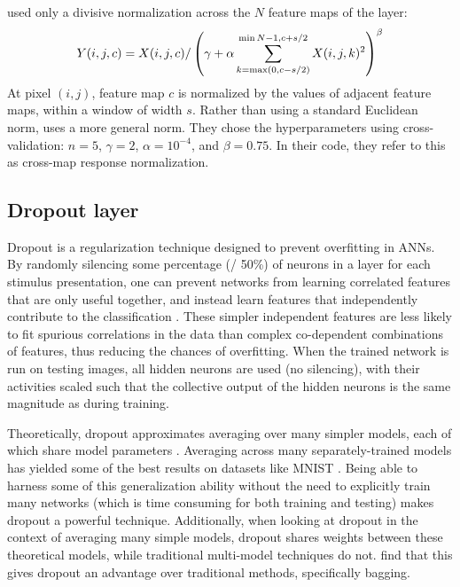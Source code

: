 \textcite{Krizhevsky2012} used only a divisive normalization across the
$N$ feature maps of the layer:
\begin{align}
  Y(i,j,c) = X(i,j,c) / \left(\gamma + \alpha\sum_{k=\max(0,c-s/2)}^{\min{N-1,c+s/2}}
    X(i,j,k)^2 \right)^\beta
  \eqnlabel{kriznorm}
\end{align}
At pixel $(i, j)$, feature map $c$ is normalized by the values of
adjacent feature maps, within a window of width $s$.
Rather than using a standard Euclidean norm,
 uses a more general norm.
They chose the hyperparameters using cross-validation:
$n = 5$, $\gamma = 2$, $\alpha = 10^{-4}$, and $\beta = 0.75$.
In their code, they refer to this as cross-map response normalization.


\subsection{Dropout layer}

Dropout \parencite{Hinton2012} is a regularization technique
designed to prevent overfitting in ANNs.
By randomly silencing some percentage (\eg/ 50\%) of neurons in a layer
for each stimulus presentation,
one can prevent networks from learning correlated features that are only useful together,
and instead learn features that independently contribute to the classification \parencite{Hinton2012}.
These simpler independent features are less likely to
fit spurious correlations in the data
than complex co-dependent combinations of features,
thus reducing the chances of overfitting.
When the trained network is run on testing images,
all hidden neurons are used (no silencing),
with their activities scaled such that the collective output
of the hidden neurons is the same magnitude as during training.

Theoretically, dropout approximates averaging over many simpler models,
each of which share model parameters \parencite{Baldi2013,Warde-Farley2013}.
Averaging across many separately-trained models
has yielded some of the best results on datasets like MNIST \parencite[\eg/][]{Ciresan2012}.
Being able to harness some of this generalization ability
without the need to explicitly train many networks
(which is time consuming for both training and testing)
makes dropout a powerful technique.
Additionally, when looking at dropout in the context of averaging many simple models,
dropout shares weights between these theoretical models,
while traditional multi-model techniques do not.
\textcite{Warde-Farley2013} find that this gives dropout an advantage
over traditional methods, specifically bagging.

